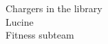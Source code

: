 \documentclass[preview]{standalone}
\begin{document}
Chargers in the library\\Lucine\\Fitness subteam\\
\end{document}
